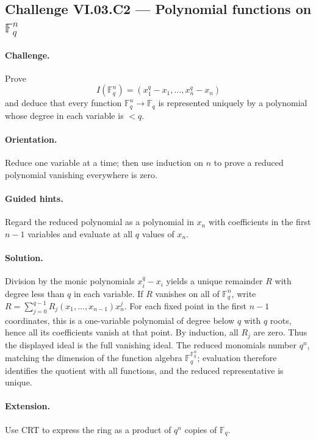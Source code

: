 \subsection*{Challenge VI.03.C2 --- Polynomial functions on \(\mathbb F_q^n\)}
\label{chall:vi03-c2}
\paragraph{Challenge.}
Prove
\[
I(\mathbb F_q^n)=(x_1^q-x_1,\dots,x_n^q-x_n)
\]
and deduce that every function \(\mathbb F_q^n\to\mathbb F_q\) is represented uniquely by a
polynomial whose degree in each variable is \(<q\).
\ifdefined\FullProblemDossiers
\paragraph{Orientation.} Reduce one variable at a time; then use induction on \(n\) to prove a reduced polynomial vanishing everywhere is zero.
\paragraph{Guided hints.} Regard the reduced polynomial as a polynomial in \(x_n\) with coefficients in the first \(n-1\) variables and evaluate at all \(q\) values of \(x_n\).
\paragraph{Solution.}
Division by the monic polynomials \(x_i^q-x_i\) yields a unique remainder \(R\) with degree
less than \(q\) in each variable.  If \(R\) vanishes on all of \(\mathbb F_q^n\), write
\(R=\sum_{j=0}^{q-1}R_j(x_1,\dots,x_{n-1})x_n^j\).  For each fixed point in the first
\(n-1\) coordinates, this is a one-variable polynomial of degree below \(q\) with \(q\)
roots, hence all its coefficients vanish at that point.  By induction, all \(R_j\) are zero.
Thus the displayed ideal is the full vanishing ideal.  The reduced monomials number \(q^n\),
matching the dimension of the function algebra \(\mathbb F_q^{\mathbb F_q^n}\); evaluation
therefore identifies the quotient with all functions, and the reduced representative is
unique.
\paragraph{Extension.} Use CRT to express the ring as a product of \(q^n\) copies of \(\mathbb F_q\).
\fi
